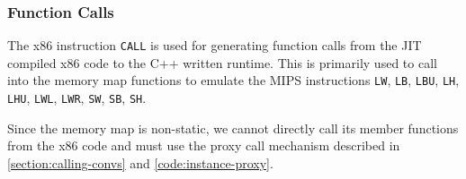 \subsubsection{Function Calls}

The x86 instruction \texttt{CALL} \cite{x86-call} is used for generating function calls from the JIT compiled x86 code to the C++ written runtime. This is primarily used to call into the memory map functions to emulate the MIPS instructions \texttt{LW}, \texttt{LB}, \texttt{LBU}, \texttt{LH}, \texttt{LHU}, \texttt{LWL}, \texttt{LWR}, \texttt{SW}, \texttt{SB}, \texttt{SH}.

Since the memory map is non-static, we cannot directly call its member functions from the x86 code and must use the proxy call mechanism described in \autoref{section:calling-convs} and \autoref{code:instance-proxy}.


